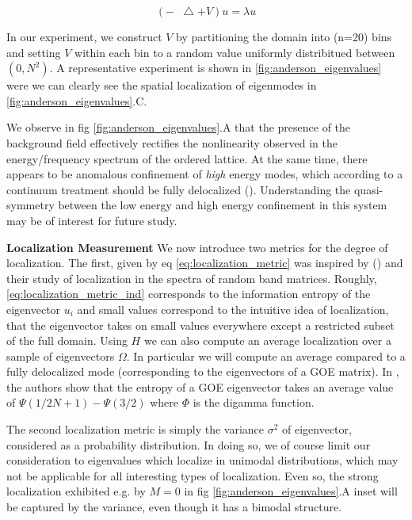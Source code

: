 \documentclass{article}
\newcommand*\Laplace{\mathop{}\!\mathbin\bigtriangleup}
\begin{document}
\begin{equation}\label{eq:anderson}
	\left( -\Laplace + V\right)u = \lambda u 
\end{equation}

In our experiment, we construct $V$ by partitioning the domain into (n=20) bins and setting $V$ within each bin to a random value uniformly distribitued between $(0, N^2)$. 
A representative experiment is shown in \ref{fig:anderson_eigenvalues} were we can clearly see the spatial localization of eigenmodes in \ref{fig:anderson_eigenvalues}.C.

We observe in fig \ref{fig:anderson_eigenvalues}.A that the presence of the background field effectively 
rectifies the nonlinearity observed in the energy/frequency spectrum of the ordered lattice.
At the same time, there appears to be anomalous confinement of \textit{high} energy modes, 
which according to a continuum treatment should be fully delocalized (\cite{Filoche2012-av}).
Understanding the quasi-symmetry between the low energy and high energy confinement in this system may be 
of interest for future study.

\textbf{Localization Measurement} We now introduce two metrics for the degree of localization. 
The first, given by eq \ref{eq:localization_metric} was inspired by (\cite{Casati1990-ma}) and their study of
localization in the spectra of random band matrices. 
Roughly, \ref{eq:localization_metric_ind} corresponds to the information entropy of the eigenvector $u_i$ and small values
correspond to the intuitive idea of localization, that the eigenvector takes on small values everywhere except a restricted subset of the full domain.
Using $H$ we can also compute an average localization over a sample of eigenvectors $\Omega$.
In particular we will compute an average compared to a fully delocalized mode (corresponding to the eigenvectors of a GOE matrix).
In \cite{Casati1990-ma}, the authors show that the entropy of a GOE eigenvector takes an average value of $\Psi \left( 1/2 N + 1 \right) - \Psi \left( 3/2 \right)$
where $\Phi$ is the digamma function.


The second localization metric is simply the variance $\sigma^2$ of eigenvector, considered as a probability distribution.
In doing so, we of course limit our consideration to eigenvalues which localize in unimodal distributions, which may not be applicable for all interesting types of localization.
Even so, the strong localization exhibited e.g. by $M=0$ in fig \ref{fig:anderson_eigenvalues}.A inset will be captured by
the variance, even though it has a bimodal structure. 
\end{document}

